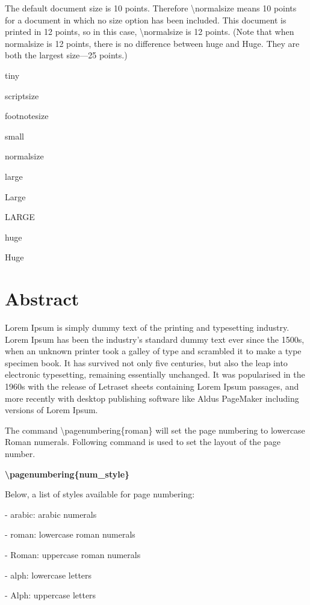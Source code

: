 \documentclass[a4paper,11pt,UTF8,openright]{book}
\begin{document}
The default document size is 10 points. Therefore \textbackslash normalsize means
10 points for a document in which no size option has been included. This document
is printed in 12 points, so in this case, \textbackslash normalsize is 12 points. (Note that when normalsize is 12 points, there is no difference between huge and Huge. They are both
the largest size—25 points.)

{\tiny tiny}

{\scriptsize scriptsize}

{\footnotesize footnotesize}

{\small small}

{\normalsize normalsize}

{\large large}

{\Large Large}

{\LARGE LARGE}

{\huge huge}

{\Huge Huge}

\chapter*{Abstract}

Lorem Ipsum is simply dummy text of the printing and typesetting industry. Lorem Ipsum has been the industry's standard dummy text ever since the 1500s, when an unknown printer took a galley of type and scrambled it to make a type specimen book. It has survived not only five centuries, but also the leap into electronic typesetting, remaining essentially unchanged. It was popularised in the 1960s with the release of Letraset sheets containing Lorem Ipsum passages, and more recently with desktop publishing software like Aldus PageMaker including versions of Lorem Ipsum.~\cite{Weir04}

The command \textbackslash pagenumbering\{roman\} will set the page numbering to lowercase Roman numerals. Following command is used to set the layout of the page number.

\textbf{\textbackslash pagenumbering\{num\_style\}}

Below, a list of styles available for page numbering:

- arabic: arabic numerals

- roman: lowercase roman numerals

- Roman: uppercase roman numerals

- alph: lowercase letters

- Alph: uppercase letters
\end{document}
